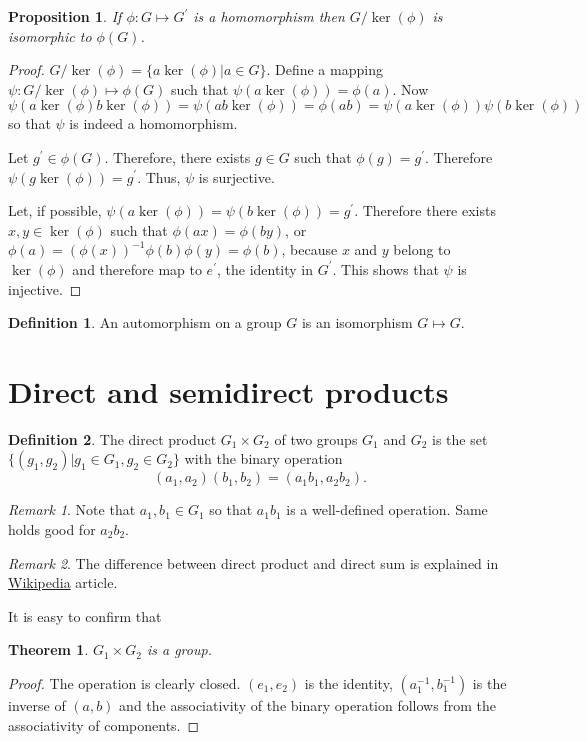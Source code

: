 \documentclass{article}
\theoremstyle{plain}
\newtheorem{thm}{Theorem}
\numberwithin{thm}{section}
\theoremstyle{plain}
\newtheorem{prop}{Proposition}
\numberwithin{prop}{section}
\theoremstyle{definition}
\newtheorem{defn}{Definition}
\numberwithin{defn}{section}
\theoremstyle{remark}
\newtheorem*{rem}{Remark}
\numberwithin{equation}{section}
\begin{document}
\begin{prop}\label{s6p7}
If $\phi:G \mapsto G^\prime$ is a homomorphism then $G/\ker(\phi)$ is 
isomorphic to $\phi(G)$.
\end{prop}
\begin{proof}
$G/\ker(\phi) = \{a\ker(\phi)| a \in G\}$. Define a mapping $\psi:G/\ker(\phi)
\mapsto \phi(G)$ such that $\psi(a\ker(\phi)) = \phi(a)$. Now $\psi(a\ker(\phi)
b\ker(\phi)) = \psi(ab\ker(\phi)) = \phi(ab) = 
\psi(a\ker(\phi))\psi(b\ker(\phi)) $ so that $\psi$ is indeed a homomorphism.

Let $g^\prime \in \phi(G)$. Therefore, there exists $g \in G$ such that 
$\phi(g) = g^\prime$. Therefore $\psi(g\ker(\phi)) = g^\prime$. Thus, $\psi$
is surjective.

Let, if possible, $\psi(a\ker(\phi)) = \psi(b\ker(\phi)) = g^\prime$. Therefore
there exists $x, y \in \ker(\phi)$ such that $\phi(ax) = \phi(by)$, or $\phi(a)
= (\phi(x))^{-1}\phi(b)\phi(y) = \phi(b)$, because $x$ and $y$ belong to 
$\ker(\phi)$ and therefore map to $e^\prime$, the identity in $G^\prime$. This
shows that $\psi$ is injective.
\end{proof}

\begin{defn}\label{s6d4}
An automorphism on a group $G$ is an isomorphism $G \mapsto G$.
\end{defn}

\section{Direct and semidirect products}\label{s7}
\begin{defn}\label{s7d1}
The direct product $G_1 \times G_2$ of two groups $G_1$ and $G_2$ is the set
$\{(g_1, g_2) | g_1 \in G_1, g_2 \in G_2\}$ with the binary operation
\[
(a_1, a_2)(b_1, b_2) = (a_1b_1, a_2b_2).
\]
\end{defn}
\begin{rem}
Note that $a_1, b_1 \in G_1$ so that $a_1b_1$ is a well-defined operation. 
Same holds good for $a_2b_2$.
\end{rem}

\begin{rem}
The difference between direct product and direct sum is explained in 
\href{https://math.stackexchange.com/questions/2412232/direct-product-vs-direct-sum-of-infinite-dimensional-vector-spaces}{Wikipedia} article.
\end{rem}

It is easy to confirm that
\begin{thm}\label{s7t1}
$G_1 \times G_2$ is a group.
\end{thm}
\begin{proof}
The operation is clearly closed. $(e_1, e_2)$ is the identity, $(a^{-1}_1, 
b_1^{-1})$ is the inverse of $(a, b)$ and the associativity of the binary
operation follows from the associativity of components. 
\end{proof}
\end{document}
